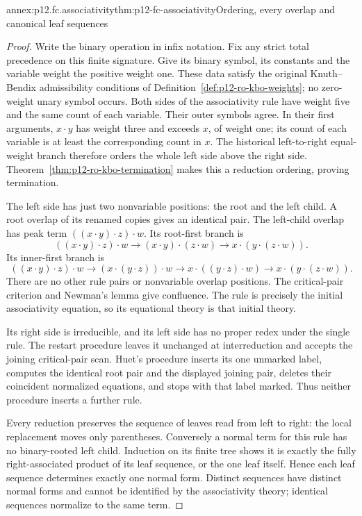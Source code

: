 \begin{annexitem}{annex:p12.fc.associativity}{thm:p12-fc-associativity}{Ordering, every overlap and canonical leaf sequences}
\begin{proof}
Write the binary operation in infix notation. Fix any strict total
precedence on this finite signature. Give its binary symbol,
its constants and the variable weight the positive weight one.
These data satisfy the original Knuth--Bendix admissibility
conditions of Definition~\ref{def:p12-ro-kbo-weights}; no zero-weight
unary symbol occurs. Both sides of the associativity rule have
weight five and the same count of each variable. Their outer
symbols agree. In their first arguments, \(x\cdot y\) has
weight three and exceeds \(x\), of weight one; its count of
each variable is at least the corresponding count in \(x\).
The historical left-to-right equal-weight branch therefore orders
the whole left side above the right side. Theorem~\ref{thm:p12-ro-kbo-termination}
makes this a reduction ordering, proving termination.

The left side has just two nonvariable positions: the root and
the left child. A root overlap of its renamed copies gives an
identical pair. The left-child overlap has peak term
\(((x\cdot y)\cdot z)\cdot w\). Its root-first branch is
\[
 ((x\cdot y)\cdot z)\cdot w
 \longrightarrow (x\cdot y)\cdot(z\cdot w)
 \longrightarrow x\cdot(y\cdot(z\cdot w)).
\]
Its inner-first branch is
\[
 ((x\cdot y)\cdot z)\cdot w
 \longrightarrow (x\cdot(y\cdot z))\cdot w
 \longrightarrow x\cdot((y\cdot z)\cdot w)
 \longrightarrow x\cdot(y\cdot(z\cdot w)).
\]
There are no other rule pairs or nonvariable overlap positions.
The critical-pair criterion and Newman's lemma give confluence.
The rule is precisely the initial associativity equation, so its
equational theory is that initial theory.

Its right side is irreducible, and its left side has no proper
redex under the single rule. The restart procedure leaves it
unchanged at interreduction and accepts the joining critical-pair
scan. Huet's procedure inserts its one unmarked label, computes
the identical root pair and the displayed joining pair, deletes
their coincident normalized equations, and stops with that label
marked. Thus neither procedure inserts a further rule.

Every reduction preserves the sequence of leaves read from left
to right: the local replacement moves only parentheses. Conversely
a normal term for this rule has no binary-rooted left child.
Induction on its finite tree shows it is exactly the fully
right-associated product of its leaf sequence, or the one leaf
itself. Hence each leaf sequence determines exactly one normal
form. Distinct sequences have distinct normal forms and cannot be
identified by the associativity theory; identical sequences normalize
to the same term.
\end{proof}
\end{annexitem}

